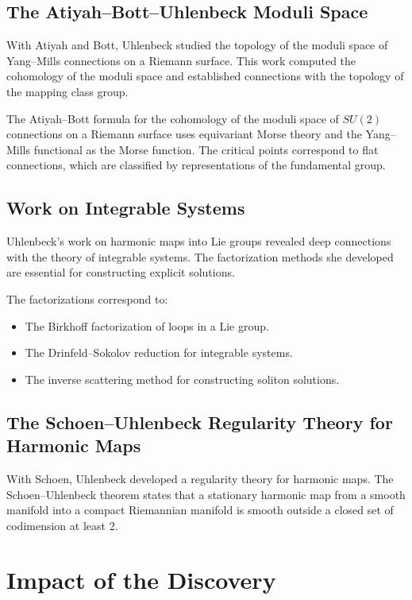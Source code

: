 \subsection{The Atiyah--Bott--Uhlenbeck Moduli Space}

With Atiyah and Bott, Uhlenbeck studied the topology of the moduli space of Yang--Mills connections on a Riemann surface. This work computed the cohomology of the moduli space and established connections with the topology of the mapping class group.

The Atiyah--Bott formula for the cohomology of the moduli space of $SU(2)$ connections on a Riemann surface uses equivariant Morse theory and the Yang--Mills functional as the Morse function. The critical points correspond to flat connections, which are classified by representations of the fundamental group.

\subsection{Work on Integrable Systems}

Uhlenbeck's work on harmonic maps into Lie groups revealed deep connections with the theory of integrable systems. The factorization methods she developed are essential for constructing explicit solutions.

The factorizations correspond to:
\begin{itemize}
\item The Birkhoff factorization of loops in a Lie group.
\item The Drinfeld--Sokolov reduction for integrable systems.
\item The inverse scattering method for constructing soliton solutions.
\end{itemize}

\subsection{The Schoen--Uhlenbeck Regularity Theory for Harmonic Maps}

With Schoen, Uhlenbeck developed a regularity theory for harmonic maps. The Schoen--Uhlenbeck theorem states that a stationary harmonic map from a smooth manifold into a compact Riemannian manifold is smooth outside a closed set of codimension at least 2.

\section{Impact of the Discovery}

